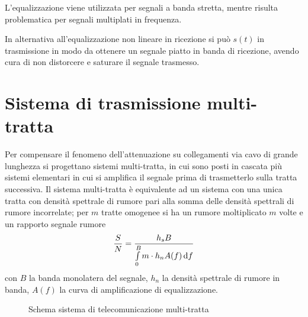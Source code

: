 L'equalizzazione viene utilizzata per segnali a banda stretta, mentre risulta problematica per segnali multiplati in frequenza.

In alternativa all'equalizzazione non lineare in ricezione si può  $s(t)$ in trasmissione in modo da ottenere un segnale piatto in banda di ricezione, avendo cura di non distorcere e saturare il segnale trasmesso.

\section{Sistema di trasmissione multi-tratta}
Per compensare il fenomeno dell'attenuazione su collegamenti via cavo di grande lunghezza si progettano sistemi multi-tratta, in cui sono posti in cascata più sistemi elementari in cui si amplifica il segnale prima di trasmetterlo sulla tratta successiva.
Il sistema multi-tratta è equivalente ad un sistema con una unica tratta con densità spettrale di rumore pari alla somma delle densità spettrali di rumore incorrelate; per $m$ tratte omogenee si ha un rumore moltiplicato $m$ volte e un rapporto segnale rumore
\[\frac{S}{N}=\frac{h_s B}{\int\limits_{0}^{B}{m\cdot h_n A(f)}{\,\mathop{}\!\mathrm{d}{f}}}\]
con $B$ la banda monolatera del segnale, $h_n$ la densità spettrale di rumore in banda, $A(f)$ la curva di amplificazione di equalizzazione.
\begin{figure}[h!]
	\centering
	
	\caption{Schema sistema di telecomunicazione multi-tratta}
	\label{fig:sistema_trasmissione_multi_tratta}
\end{figure}

